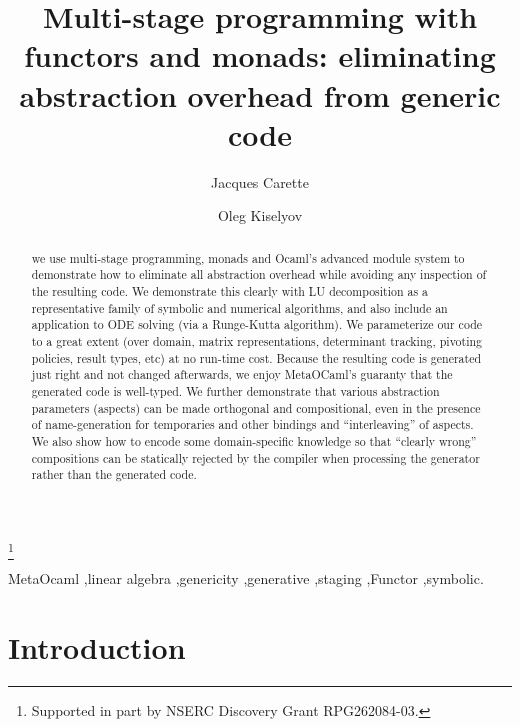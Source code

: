 \documentclass[draft]{elsart}
\begin{document}
\begin{frontmatter}
\title{Multi-stage programming with functors and monads:
eliminating abstraction overhead from generic code}
\author{Jacques Carette}
\address{McMaster University,
1280 Main St. West, Hamilton, Ontario Canada L8S 4K1}
\author{Oleg Kiselyov}
\address{FNMOC, Monterey, CA 93943}

\thanks[1]{Supported in part by NSERC Discovery Grant RPG262084-03.}

\begin{abstract}
we use multi-stage programming, monads and Ocaml's
advanced module system to demonstrate how to eliminate all
abstraction overhead while avoiding any inspection of the resulting
code.  We demonstrate this clearly with LU decomposition as a 
representative family of symbolic and numerical algorithms, and also
include an application to ODE solving (via a Runge-Kutta algorithm).
We parameterize our code to a great extent
(over domain, matrix representations, determinant tracking, 
pivoting policies, result types, etc) at no run-time cost.  Because
the resulting code is generated just right and not changed afterwards,
we enjoy MetaOCaml's guaranty that the generated code is well-typed.
We further demonstrate that various abstraction parameters (aspects)
can be made orthogonal and compositional, even in the presence of
name-generation for temporaries and other bindings and
``interleaving'' of aspects.  We also show how to encode some
domain-specific knowledge so that ``clearly wrong'' compositions can
be statically rejected by the compiler when processing the generator
rather than the generated code.
\end{abstract}

\begin{keyword}
MetaOcaml \sep linear algebra \sep genericity \sep generative \sep staging
\sep Functor \sep symbolic.
\end{keyword}
\end{frontmatter}

\section{Introduction}
\end{document}
